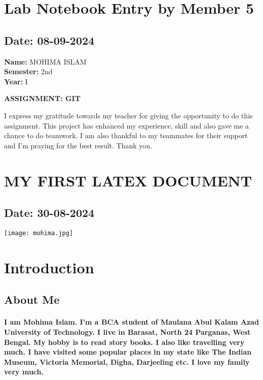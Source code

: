 \documentclass[12pt]{article}
\begin{document}
\section{Lab Notebook Entry by Member 5}
\subsection*{Date: 08-09-2024}

\begin{flushright}
\textbf{Name:} MOHIMA ISLAM \\
\textbf{Semester:} 2nd \\
\textbf{Year:} I \\
\end{flushright}

\begin{center}
\Huge \textbf{ASSIGNMENT: GIT}
\end{center}

I express my gratitude towards my teacher for giving the opportunity to do this assignment. This project has enhanced my experience, skill and also gave me a chance to do teamwork. I am also thankful to my teammates for their support and I'm praying for the best result. Thank you.
\newpage
\section{MY FIRST LATEX DOCUMENT}
\subsection*{Date: 30-08-2024}
\begin{center}
        \texttt{[image: mohima.jpg]}
     \end{center}
\section{Introduction}
\subsection{About Me}
\paragraph{I am Mohima Islam. I'm a BCA student of Maulana Abul Kalam Azad University of Technology. I live in Barasat, North 24 Parganas, West Bengal. My hobby is to read story books. I also like travelling very much. I have visited some popular places in my state like The Indian Museum, Victoria Memorial, Digha, Darjeeling etc. I love my family very much. }
\end{document}
